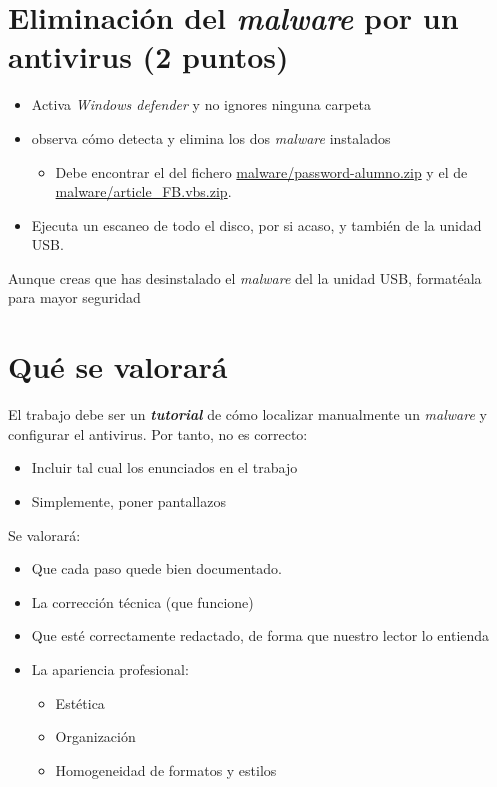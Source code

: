 \documentclass[a4paper]{article}
\begin{document}
\section{Eliminación del \emph{malware} por un antivirus (2 puntos)}
\label{sec:org0000012}
\begin{itemize}
\item Activa \emph{Windows defender} y no ignores ninguna carpeta
\item observa cómo detecta y elimina los dos \emph{malware} instalados
\begin{itemize}
\item Debe encontrar el del fichero  \href{malware/password-alumno.zip}{malware/password-alumno.zip} y el de  \url{malware/article\_FB.vbs.zip}.
\end{itemize}
\item Ejecuta un escaneo de todo el disco, por si acaso, y también de la unidad USB.
\end{itemize}

\begin{Aviso}[Precaución]
Aunque creas que has desinstalado el \emph{malware} del la unidad USB, formatéala para mayor seguridad
\end{Aviso}
\section*{Qué se valorará}
\label{sec:org0000015}
El trabajo debe ser un \emph{\textbf{tutorial}} de cómo localizar manualmente un \emph{malware} y configurar el antivirus. Por tanto, no es correcto:
\begin{itemize}
\item Incluir tal cual los enunciados en el trabajo
\item Simplemente, poner pantallazos
\end{itemize}


Se valorará:
\begin{itemize}
\item Que cada paso quede bien documentado.
\item La corrección técnica (que funcione)
\item Que esté correctamente redactado, de forma que nuestro lector lo entienda
\item La apariencia profesional:
\begin{itemize}
\item Estética
\item Organización
\item Homogeneidad de formatos y estilos
\end{itemize}
\end{itemize}
\end{document}
